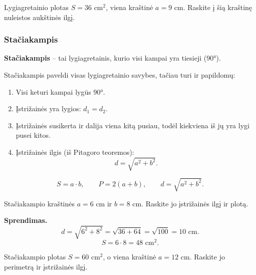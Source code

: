 \begin{exercise}
Lygiagretainio plotas $S = 36$ cm$^2$, viena kraštinė $a = 9$ cm. Raskite į šią kraštinę nuleistos aukštinės ilgį.
\end{exercise}

\subsubsection*{Stačiakampis}

\begin{definition}[Stačiakampis]
\textbf{Stačiakampis} – tai lygiagretainis, kurio visi kampai yra tiesieji ($90°$).
\end{definition}

Stačiakampis paveldi visas lygiagretainio savybes, tačiau turi ir papildomų:

\begin{theorem}
\begin{enumerate}
    \item Visi keturi kampai lygūs $90°$.
    \item Įstrižainės yra lygios: $d_1 = d_2$.
    \item Įstrižainės susikerta ir dalija viena kitą pusiau, todėl kiekviena iš jų yra lygi pusei kitos.
    \item Įstrižainės ilgis (iš Pitagoro teoremos):
    \[
    d = \sqrt{a^2 + b^2}.
    \]
\end{enumerate}
\end{theorem}

\begin{tcolorbox}[colback=blue!5!white, colframe=blue!60!black, title=Stačiakampio formulės]
\[
S = a \cdot b, \qquad P = 2(a+b), \qquad d = \sqrt{a^2 + b^2}.
\]
\end{tcolorbox}

\begin{example}
Stačiakampio kraštinės $a = 6$ cm ir $b = 8$ cm. Raskite jo įstrižainės ilgį ir plotą.

\textbf{Sprendimas.}
\[
d = \sqrt{6^2 + 8^2} = \sqrt{36 + 64} = \sqrt{100} = 10 \text{ cm}.
\]
\[
S = 6 \cdot 8 = 48 \text{ cm}^2.
\]
\end{example}

\begin{exercise}
Stačiakampio plotas $S = 60$ cm$^2$, o viena kraštinė $a = 12$ cm. Raskite jo perimetrą ir įstrižainės ilgį.
\end{exercise}

